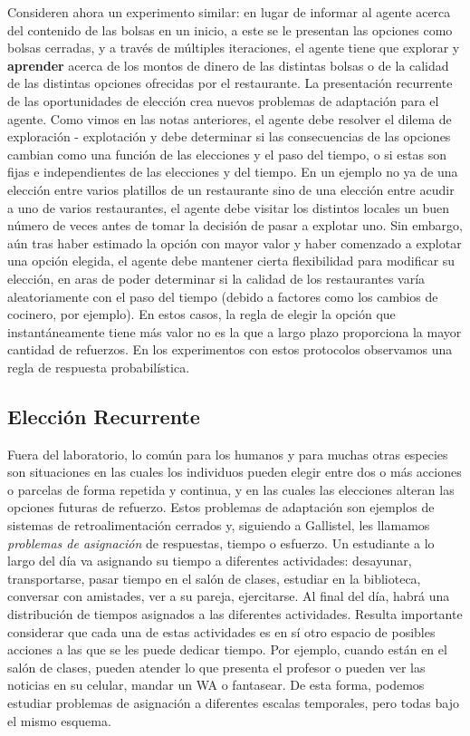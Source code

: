 \documentclass[
  letterpaper,
]{book}
\begin{document}
Consideren ahora un experimento similar: en lugar de informar al agente
acerca del contenido de las bolsas en un inicio, a este se le presentan
las opciones como bolsas cerradas, y a través de múltiples iteraciones,
el agente tiene que explorar y \textbf{aprender} acerca de los montos de
dinero de las distintas bolsas o de la calidad de las distintas opciones
ofrecidas por el restaurante. La presentación recurrente de las
oportunidades de elección crea nuevos problemas de adaptación para el
agente. Como vimos en las notas anteriores, el agente debe resolver el
dilema de exploración - explotación y debe determinar si las
consecuencias de las opciones cambian como una función de las elecciones
y el paso del tiempo, o si estas son fijas e independientes de las
elecciones y del tiempo. En un ejemplo no ya de una elección entre
varios platillos de un restaurante sino de una elección entre acudir a
uno de varios restaurantes, el agente debe visitar los distintos locales
un buen número de veces antes de tomar la decisión de pasar a explotar
uno. Sin embargo, aún tras haber estimado la opción con mayor valor y
haber comenzado a explotar una opción elegida, el agente debe mantener
cierta flexibilidad para modificar su elección, en aras de poder
determinar si la calidad de los restaurantes varía aleatoriamente con el
paso del tiempo (debido a factores como los cambios de cocinero, por
ejemplo). En estos casos, la regla de elegir la opción que
instantáneamente tiene más valor no es la que a largo plazo proporciona
la mayor cantidad de refuerzos. En los experimentos con estos protocolos
observamos una regla de respuesta probabilística.

\subsection{Elección Recurrente}\label{elecciuxf3n-recurrente}

Fuera del laboratorio, lo común para los humanos y para muchas otras
especies son situaciones en las cuales los individuos pueden elegir
entre dos o más acciones o parcelas de forma repetida y continua, y en
las cuales las elecciones alteran las opciones futuras de refuerzo.
Estos problemas de adaptación son ejemplos de sistemas de
retroalimentación cerrados y, siguiendo a Gallistel, les llamamos
\emph{problemas de asignación} de respuestas, tiempo o esfuerzo. Un
estudiante a lo largo del día va asignando su tiempo a diferentes
actividades: desayunar, transportarse, pasar tiempo en el salón de
clases, estudiar en la biblioteca, conversar con amistades, ver a su
pareja, ejercitarse. Al final del día, habrá una distribución de tiempos
asignados a las diferentes actividades. Resulta importante considerar
que cada una de estas actividades es en sí otro espacio de posibles
acciones a las que se les puede dedicar tiempo. Por ejemplo, cuando
están en el salón de clases, pueden atender lo que presenta el profesor
o pueden ver las noticias en su celular, mandar un WA o fantasear. De
esta forma, podemos estudiar problemas de asignación a diferentes
escalas temporales, pero todas bajo el mismo esquema.
\end{document}
